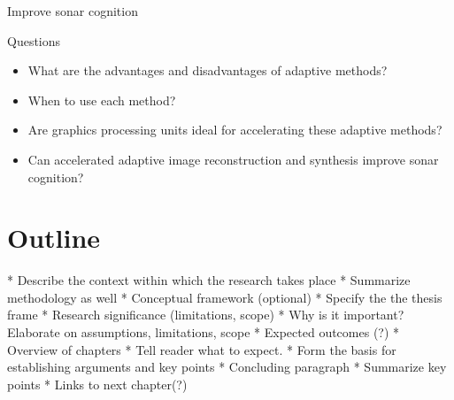 {Improve sonar cognition


Questions
\begin{itemize}
\item What are the advantages and disadvantages of adaptive methods?
\item When to use each method?
\item Are graphics processing units ideal for accelerating these adaptive methods?
\item Can accelerated adaptive image reconstruction and synthesis improve sonar cognition?
\end{itemize}

%
%
%


\section{Outline}
\ifIncludeWritingTips
\begin{markdown}
    * Describe the context within which the research takes place
    * Summarize methodology as well
* Conceptual framework (optional)
    * Specify the the thesis frame
* Research significance (limitations, scope)
    * Why is it important? Elaborate on assumptions, limitations, scope
* Expected outcomes (?)
* Overview of chapters
    * Tell reader what to expect.
    * Form the basis for establishing arguments and key points
* Concluding paragraph
    * Summarize key points
    * Links to next chapter(?)
\end{markdown}
\fi

}
